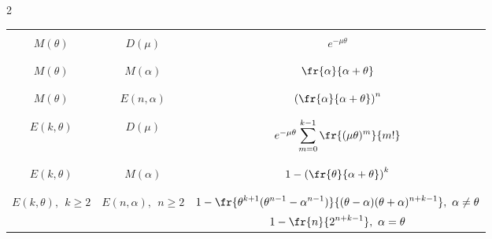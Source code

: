 \begin{multicols}{2}
\begin{table}
\begin{center}
\begin{tabular}{|c|c|c|}
&&\\[-9pt]


\hline


&&\\[-9pt]


$M(\theta)$&$D(\mu)$&$e^{-\mu\theta}$\\


&&\\[-9pt]


\hline


&&\\[-9pt]


$M(\theta)$&$M(\alpha)$&$\displaystyle\fr{\alpha}{\alpha+\theta}$\\


&&\\[-9pt]


\hline


&&\\[-9pt]


$M(\theta)$&$E(n,\alpha)$&$\left(\displaystyle\fr{\alpha}{\alpha+\theta}\right)^n$\\


&&\\[-9pt]


\hline


&&\\[-9pt]


$E(k,\theta)$&$D(\mu)$&$e^{-\mu\theta}\displaystyle\sum\limits_{m=0}^{k-1}\displaystyle\fr{(\mu\theta)^m}{m!}$\\


&&\\[-9pt]


\hline


&&\\[-9pt]


$E(k,\theta)$&$M(\alpha)$&$1-\left(\displaystyle\fr{\theta}{\alpha+\theta}\right)^k$\\


&&\\[-9pt]


\hline


&&\\[-9pt]


$E(k,\theta),\ \ k\ge2$&$E(n,\alpha),\ \ n\ge2$&$1-\displaystyle\fr{\theta^{k+1}(\theta^{n-1}-\alpha^{n-1})}{(\theta-\alpha)


(\theta+\alpha)^{n+k-1}},\ \alpha\neq\theta$\\


&&$\displaystyle1-\fr{n}{2^{n+k-1}},\  \alpha=\theta$\\



\end{tabular}
\end{center}
\end{table}
\end{multicols}
